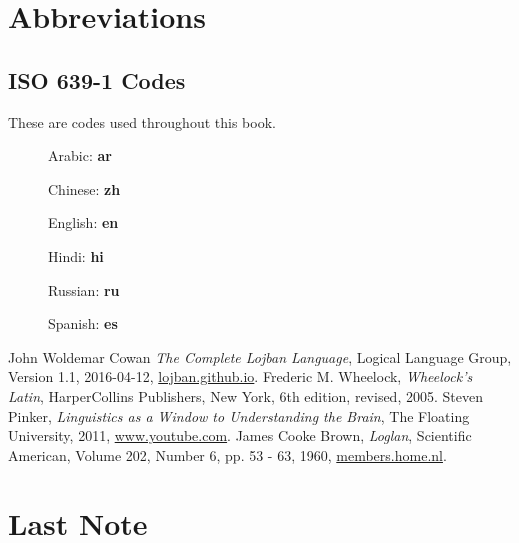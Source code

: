 \documentclass[12pt]{book}
\begin{document}




\chapter{Abbreviations}

\section{ISO 639-1 Codes}

These are codes used throughout this book.

\begin{description}
\item[ ] Arabic: \textbf{ar}
\item[ ] Chinese: \textbf{zh}
\item[ ] English: \textbf{en}
\item[ ] Hindi: \textbf{hi}
\item[ ] Russian: \textbf{ru}
\item[ ] Spanish: \textbf{es}
\end{description}

\begin{thebibliography}{9}
	John Woldemar Cowan
	\textit{The Complete Lojban Language},
	Logical Language Group,
	Version 1.1,
	2016-04-12,
	\href{https://lojban.github.io/cll/}{lojban.github.io}.
	Frederic M. Wheelock,
	\textit{Wheelock's Latin},
	HarperCollins Publishers, New York,
	6th edition, revised,
	2005.
	Steven Pinker,
	\textit{Linguistics as a Window to Understanding the Brain},
	The Floating University,
	2011,
	\href{https://www.youtube.com/watch?v=Q-B_ONJIEcE}{www.youtube.com}.
	James Cooke Brown,
	\textit{Loglan},
	Scientific American,
	Volume 202, Number 6, pp. 53 - 63,
	1960,
	\href{http://members.home.nl/w.dijkhuis/loglan_jcb/Brown_JC_loglan.html}{members.home.nl}.
\end{thebibliography}

\backmatter 

\chapter{Last Note}
\end{document}
